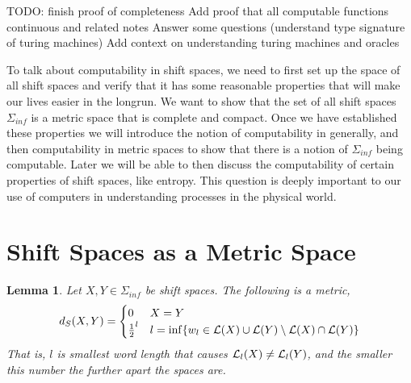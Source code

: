 \documentclass[11pt, reqno]{amsart}
\theoremstyle{plain}
\newtheorem{lemma}[thm]{Lemma}
\theoremstyle{definition}
\begin{document}
TODO: finish proof of completeness
Add proof that all computable functions continuous and related notes
Answer some questions (understand type signature of turing machines)
Add context on understanding turing machines and oracles

To talk about computability in shift spaces, we need to first set up the space of all shift spaces and verify that it has some reasonable properties that will make our lives easier in the longrun. We want to show that the set of all shift spaces $\Sigma_{inf}$ is a metric space that is complete and compact. Once we have established these properties we will introduce the notion of computability in generally, and then computability in metric spaces to show that there is a notion of $\Sigma_{inf}$ being computable. Later we will be able to then discuss the computability of certain properties of shift spaces, like entropy. This question is deeply important to our use of computers in understanding processes in the physical world.

\section{Shift Spaces as a Metric Space}
\begin{lemma}
    Let $X, Y \in \Sigma_{inf}$ be shift spaces. The following is a metric, 
    $$d_S(X,Y) = \begin{cases}
        0 & X = Y \\ 
        \frac{1}{2}^l & l = \inf \{w_l \in \mathcal{L}(X) \cup \mathcal{L}(Y) \setminus \mathcal{L}(X) \cap \mathcal{L}(Y)\}
    \end{cases}$$
    That is, $l$ is smallest word length that causes $\mathcal{L}_l(X) \neq \mathcal{L}_l(Y)$, and the smaller this number the further apart the spaces are.
\end{lemma}
\end{document}
